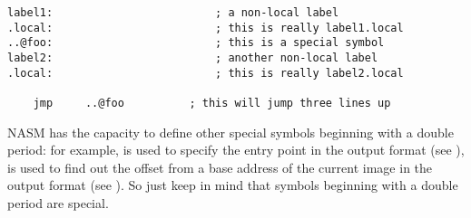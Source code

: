 \begin{lstlisting}
label1:                         ; a non-local label
.local:                         ; this is really label1.local
..@foo:                         ; this is a special symbol
label2:                         ; another non-local label
.local:                         ; this is really label2.local

	jmp     ..@foo          ; this will jump three lines up
\end{lstlisting}

NASM has the capacity to define other special symbols beginning with
a double period: for example,  is used to specify the
entry point in the  output format (see ),
 is used to find out the offset from a base address
of the current image in the  output format
(see ). So just keep in mind that symbols
beginning with a double period are special.

